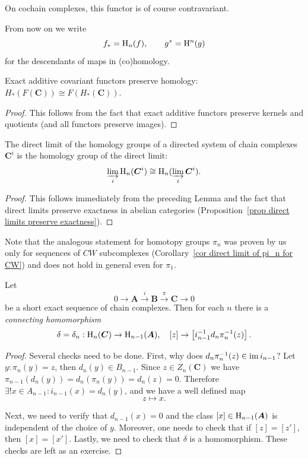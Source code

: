 \begin{rem}
    On cochain complexes, this functor is of course contravariant.
\end{rem}

From now on we write
\[f_\ast=\mathrm{H}_n(f),\quad\quad g^\ast=\mathrm{H}^n(g)\]
for the descendants of maps in (co)homology.

\begin{lem}
    Exact additive covariant functors preserve homology: $H_\ast(F(\bm{C}))\cong F(H_\ast(\bm{C}))$.
\end{lem}
\begin{proof}
    This follows from the fact that exact additive functors preserve kernels and quotients (and all functors preserve images).
\end{proof}

\begin{prop}
    The direct limit of the homology groups of a directed system of chain complexes $\bm{C}^i$ is the homology group  of the direct limit:
    \[\varinjlim_i \mathrm{H}_n(\boldsymbol{C}^i)\cong \mathrm{H}_n(\varinjlim_i \boldsymbol{C}^i).\]
\end{prop}
\begin{proof}
    This follows immediately from the preceding Lemma and the fact that direct limits preserve exactness in abelian categories (Proposition~\ref{prop direct limits preserve exactness}).
\end{proof}
\begin{rem}
    Note that the analogous statement for homotopy groups $\pi_n$ was proven by us only for sequences of $CW$ subcomplexes (Corollary~\ref{cor direct limit of pi_n for CW}) and does not hold in general even for $\pi_1$.
\end{rem}



\begin{thm}\label{connecting hom in homology}
    Let 
    \[0\to \bm{A}\overset i\to \bm{B}\overset\pi\to \bm{C}\to 0 \]
    be a short exact sequence of chain complexes. Then for each $n$ there is a \emph{connecting homomorphism}
    \[\delta=\delta_n:\mathrm{H}_n(\boldsymbol{C})\to \mathrm{H}_{n-1}(\boldsymbol{A}),\quad [z]\to \left[i_{n-1}^{-1} d_n\pi_n^{-1}(z)\right].\]
\end{thm}
\begin{proof}
    Several checks need to be done. First, why does $d_n\pi_n^{-1}(z)\in\operatorname{im} i_{n-1}$? Let $y:\pi_n(y)=z$, then $d_n(y)\in B_{n-1}$. Since $z\in Z_n(\bm{C})$ we have $\pi_{n-1}(d_n(y))=d_n(\pi_n(y))=d_n(z)=0$. Therefore $\exists ! x\in A_{n-1}:i_{n-1}(x)=d_n(y)$, and we have a well defined map
    \[z\mapsto x.\]
    
    Next, we need to verify that $d_{n-1}(x)=0$ and the class $[x]\in \mathrm{H}_{n-1}(\boldsymbol{A})$ is independent of the choice of $y$.
    Moreover, one needs to check that if $[z]=[z']$, then $[x]=[x']$. Lastly, we need to check that $\delta$ is a homomorphism. These checks are left as an exercise.
\end{proof}

